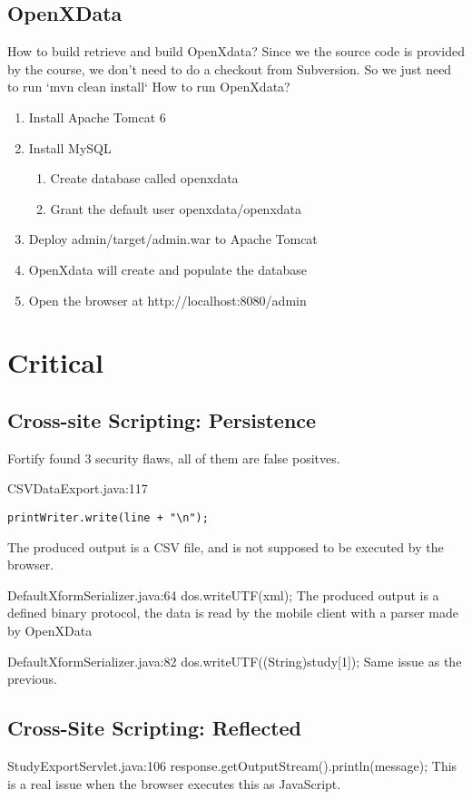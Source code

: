 \documentclass[11pt,a4paper]{article}
\theoremstyle{definition}
\begin{document}
\subsection{OpenXData}
How to build retrieve and build OpenXdata?
Since we the source code is provided by the course, we don’t need to do a checkout from Subversion. So we just need to run `mvn clean install`
How to run OpenXdata?
\begin{enumerate}
 \item Install Apache Tomcat 6 
 \item Install MySQL
 \begin{enumerate}
  \item Create database called openxdata
  \item Grant the default user openxdata/openxdata
 \end{enumerate}
 \item Deploy admin/target/admin.war to Apache Tomcat
 \item OpenXdata will create and populate the database
 \item Open the browser at http://localhost:8080/admin
\end{enumerate}

\section{Critical}

\subsection{Cross-site Scripting: Persistence}
Fortify found 3 security flaws, all of them are false positves.

CSVDataExport.java:117
\begin{lstlisting}
printWriter.write(line + "\n");
\end{lstlisting}
The produced output is a CSV file, and is not supposed to be executed by the browser.

DefaultXformSerializer.java:64
dos.writeUTF(xml);
The produced output is a defined binary protocol, the data is read by the mobile client with a parser made by OpenXData

DefaultXformSerializer.java:82
dos.writeUTF((String)study[1]);
Same issue as the previous.

\subsection{Cross-Site Scripting: Reflected}
StudyExportServlet.java:106
response.getOutputStream().println(message);
This is a real issue when the browser executes this as JavaScript.
\end{document}
